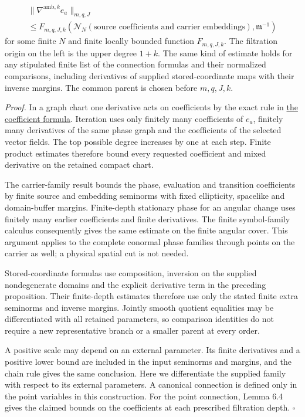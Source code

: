 \documentclass[
  english,
  11pt,
  reqno]{amsart}
\begin{document}
\label{eq:online-point-connection-finite-bound} \[
\begin{multlined}
\|\nabla^{\mathrm{amb},k}e_a\|_{m,q,J}
\\
\le F_{m,q,J,k}\left(
\mathcal N_N(\text{source coefficients and carrier embeddings}),
\mathfrak m^{-1}\right)
\end{multlined}
\] for some finite \(N\) and finite locally bounded function
\(F_{m,q,J,k}\). The filtration origin on the left is the upper degree
\(1+k\). The same kind of estimate holds for any stipulated finite list
of the connection formulas and their normalized comparisons, including
derivatives of supplied stored-coordinate maps with their inverse
margins. The common parent is chosen before \(m,q,J,k\).

\emph{Proof.} In a graph chart one derivative acts on coefficients by
the exact rule in
\hyperref[eq:online-ambient-point-coefficient-derivative]{the
coefficient formula}. Iteration uses only finitely many coefficients of
\(e_a\), finitely many derivatives of the same phase graph and the
coefficients of the selected vector fields. The top possible degree
increases by one at each step. Finite product estimates therefore bound
every requested coefficient and mixed derivative on the retained compact
chart.

The carrier-family result bounds the phase, evaluation and transition
coefficients by finite source and embedding seminorms with fixed
ellipticity, spacelike and domain-buffer margins. Finite-depth
stationary phase for an angular change uses finitely many earlier
coefficients and finite derivatives. The finite symbol-family calculus
consequently gives the same estimate on the finite angular cover. This
argument applies to the complete conormal phase families through points
on the carrier as well; a physical spatial cut is not needed.

Stored-coordinate formulas use composition, inversion on the supplied
nondegenerate domains and the explicit derivative term in the preceding
proposition. Their finite-depth estimates therefore use only the stated
finite extra seminorms and inverse margins. Jointly smooth quotient
equalities may be differentiated with all retained parameters, so
comparison identities do not require a new representative branch or a
smaller parent at every order.

A positive scale may depend on an external parameter. Its finite
derivatives and a positive lower bound are included in the input
seminorms and margins, and the chain rule gives the same conclusion.
Here we differentiate the supplied family with respect to its external
parameters. A canonical connection is defined only in the point
variables in this construction. For the point connection, Lemma 6.4
gives the claimed bounds on the coefficients at each prescribed
filtration depth. \hfill\(\square\)
\end{document}
